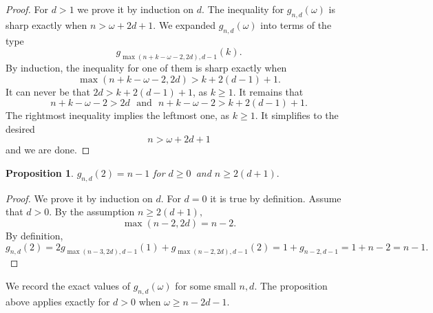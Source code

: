 \documentclass{article}
\theoremstyle{plain}
\newtheorem{prop}[thm]{Proposition}
\theoremstyle{definition}
\begin{document}
\begin{proof}
For $d>1$ we prove it by induction on $d.$ The inequality for $g_{n,d}(\omega)$ is sharp exactly when $n> \omega +2d+1.$ We expanded $g_{n,d}(\omega)$ into terms of the type
\[ g_{\max(n+k-\omega-2,2d),d-1}( k ). \]
By induction, the inequality for one of them is sharp exactly when
\[
\max(n+k-\omega-2,2d) > k + 2(d-1) + 1.
\]
It can never be that $2d> k + 2(d-1) + 1$, as $k\geq 1.$ It remains that
\[ n+k-\omega-2>2d \,\, \textrm{ and } \,\, n+k-\omega-2> k + 2(d-1) + 1. \]
The rightmost inequality implies the leftmost one, as $k\geq 1.$ It simplifies to
the desired
\[ n> \omega +2d+1
\]
and we are done.
\end{proof}


 
 \begin{prop}\label{gTriangleFree} $ g_{n,d}(2) = n-1$ for $d\geq 0$ and $n\geq 2(d+1).$
\end{prop}
\begin{proof} We prove it by induction on $d.$ For $d=0$ it is true by definition. Assume that $d>0.$
By the assumption $n\geq 2(d+1),$
\[ \max(n-2,2d) = n-2. \] 
By definition,
\[ g_{n,d}(2)  = 2g_{\max(n-3,2d),d-1}(1) + g_{\max(n-2,2d),d-1}(2) = 1 + g_{n-2,d-1}=1+n-2=n-1.\]
\end{proof}



 We record the exact values of $g_{n,d}(\omega)$ for some small $n,d.$ The proposition above applies exactly for $d>0$ when $\omega \geq n - 2d - 1 .$
 
\end{document}
